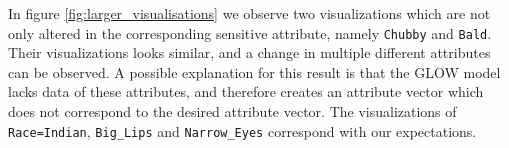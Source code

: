 In figure \ref{fig:larger_visualisations} we observe two visualizations which are not only altered in the corresponding sensitive attribute, namely \texttt{Chubby} and \texttt{Bald}. Their visualizations looks similar, and a change in multiple different attributes can be observed. A possible explanation for this result is that the GLOW model lacks data of these attributes, and therefore creates an attribute vector which does not correspond to the desired attribute vector. The visualizations of \texttt{Race=Indian}, \texttt{Big\_Lips} and \texttt{Narrow\_Eyes} correspond with our expectations.

